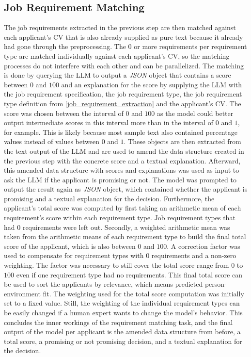 \documentclass[draft,final]{thesisclass} %
\begin{document}
\subsection{Job Requirement Matching} \label{job_requirement_matching}
The job requirements extracted in the previous step are then matched against each applicant's \acs{CV} that is also already supplied as pure text because it already had gone through the preprocessing.
The $0$ or more requirements per requirement type are matched individually against each applicant's \acs{CV}, so the matching processes do not interfere with each other and can be parallelized.
The matching is done by querying the \acs{LLM} to output a \textit{JSON} object that contains a score between $0$ and $100$ and an explanation for the score by supplying the \acs{LLM} with the job requirement specification, the job requirement type, the job requirement type definition from \ref{job_requirement_extraction} and the applicant's \acs{CV}.
The score was chosen between the interval of $0$ and $100$ as the model could better output intermediate scores in this interval more than in the interval of $0$ and $1$, for example.
This is likely because most sample text also contained percentage values instead of values between $0$ and $1$.
These objects are then extracted from the text output of the \acs{LLM} and are used to amend the data structure created in the previous step with the concrete score and a textual explanation.
Afterward, this amended data structure with scores and explanations was used as input to ask the \acs{LLM} if the applicant is promising or not.
The model was prompted to output the result again as \textit{JSON} object, which contained whether the applicant is promising and a textual explanation for the decision.
Furthermore, the applicant's total score was computed by first taking an arithmetic mean of each requirement's score within each requirement type. Job requirement types that had $0$ requirements were left out.
Secondly, a weighted arithmetic mean was taken from the arithmetic means of each requirement type to build the final total score of the applicant, which is also between $0$ and $100$.
A correction factor was used to compensate for requirement types with $0$ requirements and a non-zero weighting. The factor was necessary to still cover the total score range from $0$ to $100$ even if one requirement type had no requirements.
This final total score can be used to sort the applicants by relevance, which means predicted person-environment fit.
The weighting used for the total score computation was initially set to a fixed value. Still, the weighting of the individual requirement types can be easily changed if a human expert wants to change the model's behavior.
This concludes the inner workings of the requirement matching task, and the final output of the model per applicant is the amended data structure from before, a total score, a promising or not promising decision, and a textual explanation for the decision.
\end{document}
